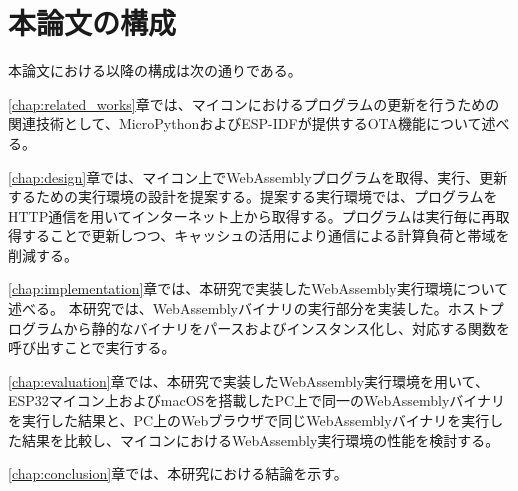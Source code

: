 \section{本論文の構成}

本論文における以降の構成は次の通りである。

\ref{chap:related_works}章では、マイコンにおけるプログラムの更新を行うための関連技術として、MicroPythonおよびESP-IDFが提供するOTA機能について述べる。

\ref{chap:design}章では、マイコン上でWebAssemblyプログラムを取得、実行、更新するための実行環境の設計を提案する。提案する実行環境では、プログラムをHTTP通信を用いてインターネット上から取得する。プログラムは実行毎に再取得することで更新しつつ、キャッシュの活用により通信による計算負荷と帯域を削減する。

\ref{chap:implementation}章では、本研究で実装したWebAssembly実行環境について述べる。
本研究では、WebAssemblyバイナリの実行部分を実装した。ホストプログラムから静的なバイナリをパースおよびインスタンス化し、対応する関数を呼び出すことで実行する。

\ref{chap:evaluation}章では、本研究で実装したWebAssembly実行環境を用いて、ESP32マイコン上およびmacOSを搭載したPC上で同一のWebAssemblyバイナリを実行した結果と、PC上のWebブラウザで同じWebAssemblyバイナリを実行した結果を比較し、マイコンにおけるWebAssembly実行環境の性能を検討する。

\ref{chap:conclusion}章では、本研究における結論を示す。
